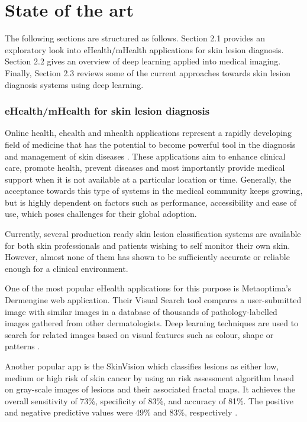 

\chapter{State of the art}
\label{chapter:sota}

The following sections are structured as follows. Section 2.1 provides an exploratory look into eHealth/mHealth applications for skin lesion diagnosis. Section 2.2 gives an overview of deep learning applied into medical imaging. Finally, Section 2.3 reviews some of the current approaches towards skin lesion diagnosis systems using deep learning. 
\subsection{eHealth/mHealth for skin lesion diagnosis}
Online health, ehealth and mhealth applications represent a rapidly developing field of medicine that has the potential to become powerful tool in the diagnosis and management of skin diseases \cite{Jaworek-Korjakowska2018}. These applications aim to enhance clinical care, promote health, prevent diseases and most importantly provide medical support when it is not available at a particular location or time. Generally, the acceptance towards this type of systems in the medical community keeps growing, but is highly dependent on factors such as performance, accessibility and ease of use, which poses challenges for their global adoption. \par
Currently, several production ready skin lesion classification systems are  available for both skin professionals and patients wishing to self monitor their own skin. However, almost none of them has shown to be sufficiently accurate or reliable enough for a clinical environment. \par 
One of the most popular eHealth applications for this purpose is Metaoptima's Dermengine web application. Their Visual Search tool compares a user-submitted image with similar images in a database of thousands of pathology-labelled images gathered from  other dermatologists. Deep learning techniques are used to search for related images based on visual features such as colour, shape or patterns \cite{dermengine}. \par
Another popular app is the SkinVision which classifies lesions as either low, medium or high risk of skin cancer by using an risk assessment algorithm based on gray-scale images of lesions and their associated fractal maps. It achieves the overall sensitivity of 73\%, specificity of 83\%, and accuracy of 81\%. The positive and negative predictive values were 49\% and 83\%, respectively \cite{Jaworek-Korjakowska2018}.
